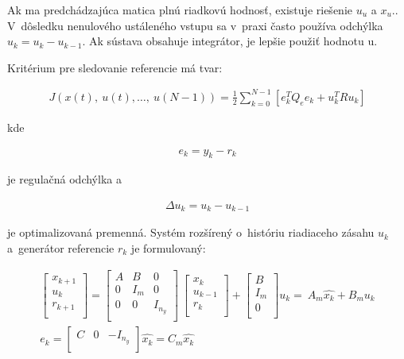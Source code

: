 Ak ma predchádzajúca matica plnú riadkovú hodnosť, existuje riešenie \(u_{u}\)
a \(x_{u}.\). V~dôsledku nenulového ustáleného vstupu sa v~praxi často
používa odchýlka \(u_{k} = u_{k} - u_{k - 1}\). Ak sústava obsahuje
integrátor, je lepšie použiť hodnotu u. \cite{MPC05}

Kritérium pre sledovanie referencie má tvar:

\begin{equation} \label{eq27}
\begin{split}
J\left( x\left( t \right),\ u\left( t \right),\ldots,\ u\left( N - 1 \right) \right) = \frac{1}{2}\sum_{k = 0}^{N - 1}\left\lbrack e_{k}^{T}Q_{e}e_{k} + u_{k}^{T}Ru_{k} \right\rbrack
\end{split}
\end{equation}

kde 

\begin{equation} \label{eq28}
\begin{split}
e_{k} = y_{k} - r_{k}
\end{split}
\end{equation}

je regulačná odchýlka a

\begin{equation} \label{eq29}
\begin{split}
\Delta u_{k} = u_{k} - u_{k - 1}
\end{split}
\end{equation}

je optimalizovaná premenná. Systém rozšírený o~históriu riadiaceho
zásahu \(u_{k}\) a~generátor referencie \(r_{k}\) je formulovaný:

\begin{equation} \label{eq30}
\begin{split}
\begin{bmatrix}
x_{k + 1} \\
u_{k} \\
r_{k + 1} \\
\end{bmatrix} = \begin{bmatrix}
A & B & 0 \\
0 & I_{m} & 0 \\
0 & 0 & I_{n_{y}} \\
\end{bmatrix}\ \begin{bmatrix}
x_{k} \\
u_{k - 1} \\
r_{k} \\
\end{bmatrix} + \begin{bmatrix}
B \\
I_{m} \\
0 \\
\end{bmatrix}u_{k} = \ A_{m}\hat{x_{k}} + B_{m}u_{k} \\
e_{k} = \begin{bmatrix}
C & 0 & - I_{n_{y}} \\
\end{bmatrix}\hat{x_{k}} = C_{m}\hat{x_{k}}
\end{split}
\end{equation}

